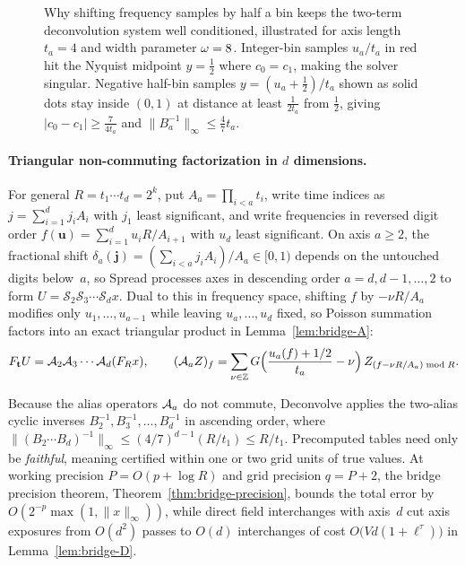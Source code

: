 \begin{figure}[t]
\caption{Why shifting frequency samples by half a bin keeps the two-term deconvolution system well conditioned, illustrated for axis length $t_a=4$ and width parameter $\omega=8$. Integer-bin samples $u_a/t_a$ in red hit the Nyquist midpoint $y=\frac12$ where $c_0=c_1$, making the solver singular. Negative half-bin samples $y=(u_a+\frac12)/t_a$ shown as solid dots stay inside $(0,1)$ at distance at least $\frac{1}{2t_a}$ from $\frac12$, giving $|c_0-c_1|\ge\frac{7}{4t_a}$ and $\|B_a^{-1}\|_\infty\le \frac47 t_a$.}
\label{fig:kernel-sampling}
\end{figure}

\paragraph{Triangular non-commuting factorization in $d$ dimensions.}
For general $R=t_1\cdots t_d=2^k$, put $A_a=\prod_{i<a}t_i$, write time indices as $j=\sum_{i=1}^d j_i A_i$ with $j_1$ least significant, and write frequencies in reversed digit order $f(\mathbf u)=\sum_{i=1}^d u_i R/A_{i+1}$ with $u_d$ least significant. On axis $a\ge 2$, the fractional shift $\delta_a(\mathbf j)=(\sum_{i<a}j_i A_i)/A_a\in[0,1)$ depends on the untouched digits below~$a$, so \textsf{Spread} processes axes in descending order $a=d,d-1,\dots,2$ to form $U=\mathcal S_2\mathcal S_3\cdots\mathcal S_d x$. Dual to this in frequency space, shifting $f$ by $-\nu R/A_a$ modifies only $u_1,\dots,u_{a-1}$ while leaving $u_a,\dots,u_d$ fixed, so Poisson summation factors into an exact triangular product in Lemma~\ref{lem:bridge-A}:
\begin{equation}\label{eq:overview-triangular}
  F_{\mathbf t}U = \mathcal{A}_2\mathcal{A}_3\cdots\mathcal{A}_d(F_R x), \qquad
  (\mathcal{A}_a Z)_f = \sum_{\nu\in\mathbb{Z}} G\Bigl(\frac{u_a(f)+1/2}{t_a}-\nu\Bigr)\,Z_{(f-\nu R/A_a)\bmod R}.
\end{equation}

Because the alias operators $\mathcal{A}_a$ do not commute, \textsf{Deconvolve} applies the two-alias cyclic inverses $B_2^{-1},B_3^{-1},\dots,B_d^{-1}$ in ascending order, where $\|(B_2\cdots B_d)^{-1}\|_\infty\le (4/7)^{d-1}(R/t_1)\le R/t_1$. Precomputed tables need only be \emph{faithful}, meaning certified within one or two grid units of true values. At working precision $P=O(p+\log R)$ and grid precision $q=P+2$, the bridge precision theorem, Theorem~\ref{thm:bridge-precision}, bounds the total error by $O(2^{-p}\max(1,\|x\|_\infty))$, while direct field interchanges with axis~$d$ cut axis exposures from $O(d^2)$ passes to $O(d)$ interchanges of cost $O\bigl(V d(1+\ell^\tau)\bigr)$ in Lemma~\ref{lem:bridge-D}.

